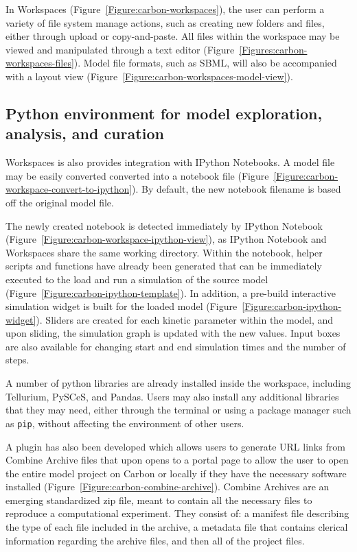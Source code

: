 In Workspaces (Figure~\ref{Figure:carbon-workspaces}), the user can perform a variety of file system manage actions, such as creating new folders and files, either through upload or copy-and-paste.
All files within the workspace may be viewed and manipulated through a text editor (Figure~\ref{Figures:carbon-workspaces-files}).
Model file formats, such as SBML, will also be accompanied with a layout view (Figure~\ref{Figure:carbon-workspaces-model-view}).

\subsection{Python environment for model exploration, analysis, and curation}

Workspaces is also provides integration with IPython Notebooks.
A model file may be easily converted converted into a notebook file (Figure~\ref{Figure:carbon-workspace-convert-to-ipython}).
By default, the new notebook filename is based off the original model file.

The newly created notebook is detected immediately by IPython Notebook (Figure~\ref{Figure:carbon-workspace-ipython-view}), as IPython Notebook and Workspaces share the same working directory.
Within the notebook, helper scripts and functions have already been generated that can be immediately executed to the load and run a simulation of the source model (Figure~\ref{Figure:carbon-ipython-template}).
In addition, a pre-build interactive simulation widget is built for the loaded model (Figure~\ref{Figure:carbon-ipython-widget}).
Sliders are created for each kinetic parameter within the model, and upon sliding, the simulation graph is updated with the new values.
Input boxes are also available for changing start and end simulation times and the number of steps.

A number of python libraries are already installed inside the workspace, including Tellurium, PySCeS, and Pandas.
Users may also install any additional libraries that they may need, either through the terminal or using a package manager such as \texttt{pip}, without affecting the environment of other users.

A plugin has also been developed which allows users to generate URL links from Combine Archive \autocite{combine2014archive} files that upon opens to a portal page to allow the user to open the entire model project on Carbon or locally if they have the necessary software installed (Figure~\ref{Figure:carbon-combine-archive}).
Combine Archives are an emerging standardized zip file, meant to contain all the necessary files to reproduce a computational experiment.
They consist of: a manifest file describing the type of each file included in the archive, a metadata file that contains clerical information regarding the archive files, and then all of the project files. 



